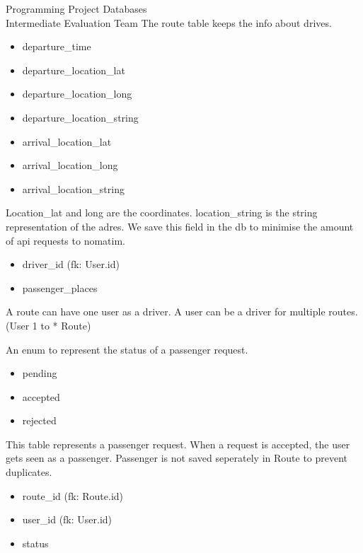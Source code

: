 \documentclass{article}
\newcounter{team}
\begin{document}
\begin{Minutes}{Programming Project Databases \\ Intermediate Evaluation Team }
            The route table keeps the info about drives.
            \begin{itemize}
                \item departure\_time
                \item departure\_location\_lat
                \item departure\_location\_long
                \item departure\_location\_string
                \item arrival\_location\_lat
                \item arrival\_location\_long
                \item arrival\_location\_string
            \end{itemize}
            Location\_lat and long are the coordinates. location\_string is the string representation of the adres. We save this field in the db to minimise the amount of api requests to nomatim.
            \begin{itemize}
                \item driver\_id (fk: User.id)
                \item passenger\_places
            \end{itemize}

            A route can have one user as a driver. A user can be a driver for multiple routes. (User 1 to * Route)

            An enum to represent the status of a passenger request.
            \begin{itemize}
                \item pending
                \item accepted
                \item rejected
            \end{itemize}

            This table represents a passenger request. When a request is accepted, the user gets seen as a passenger. Passenger is not saved seperately in Route to prevent duplicates.
            \begin{itemize}
                \item route\_id (fk: Route.id)
                \item user\_id (fk: User.id)
                \item status
            \end{itemize}


\end{Minutes}
\end{document}
